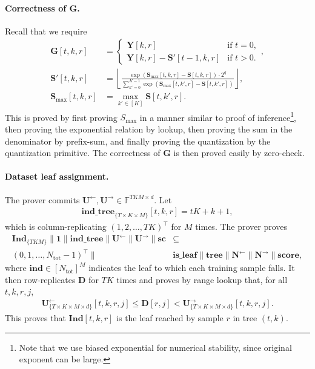 \paragraph{Correctness of $\mathbf{G}$.}
Recall that we require
\[
\begin{aligned}
    \mathbf{G}[t, k, r] &= \begin{cases}
        \mathbf{Y}[k, r] & \text{if } t=0,\\
        \mathbf{Y}[k, r] - \mathbf{S}'[t-1, k, r] & \text{if } t>0.
    \end{cases},\\
    \mathbf{S}'[t, k, r] &= \left\lfloor\frac{\exp(\mathbf{S}_{\mathrm{max}}[t, k, r] - \mathbf{S}[t, k, r])\cdot 2^q}{\sum_{k'=0}^{K-1} \exp(\mathbf{S}_{\mathrm{max}}[t, k', r] - \mathbf{S}[t, k', r])}\right\rfloor,\\
    \mathbf{S}_{\mathrm{max}}[t,k , r] &= \max_{k'\in[K]} \mathbf{S}[t, k', r].
\end{aligned}
\]
This is proved by first proving $S_{\mathrm{max}}$ in a manner
similar to proof of inference\footnote{Note that we use biased exponential for numerical stability, since original exponent can be large.}, then proving the exponential relation by lookup, then proving the sum in the denominator by prefix-sum, and finally proving the quantization by the quantization primitive. The correctness of $\mathbf{G}$ is then proved easily by zero-check.

\paragraph{Dataset leaf assignment.}
The prover commits
$\mathbf{U}^{\leftarrow},\mathbf{U}^{\rightarrow}
\in\mathbb{F}^{TKM\times d}$.
Let
\begin{align}
    \mathbf{ind\_tree}_{\{T\times K\times M\}}[t,k,r]=tK+k+1,
\end{align}
which is column-replicating $(1, 2, \dots, TK)^\top$ for $M$ times.
The prover proves
\begin{align}
    \mathbf{Ind}_{\{TKM\}}\|\mathbf{1}\|\mathbf{ind\_tree}\|
    \mathbf{U}^{\leftarrow}\|\mathbf{U}^{\rightarrow}\|\mathbf{sc}
    &\subseteq\\
    (0,1,\dots,N_{\mathrm{tot}}-1)^\top\|&
    \mathbf{is\_leaf}\|\mathbf{tree}\|\mathbf{N}^{\leftarrow}\|\mathbf{N}^{\rightarrow}\| \mathbf{score},
\end{align}
where $\mathbf{ind}\in [N_{\mathrm{tot}}]^M$ indicates the leaf to which each training sample falls.
It then row-replicates $\mathbf{D}$ for $TK$ times and proves by range lookup
that, for all $t,k,r,j$,
\begin{align}
    \mathbf{U}^{\leftarrow}_{\{T\times K\times M\times d\}}[t,k,r,j]
    \leq
    \mathbf{D}[r,j]
    <
    \mathbf{U}^{\rightarrow}_{\{T\times K\times M\times d\}}[t,k,r,j].
\end{align}
This proves that $\mathbf{Ind}[t,k,r]$ is the leaf reached by sample $r$ in
tree $(t,k)$.

